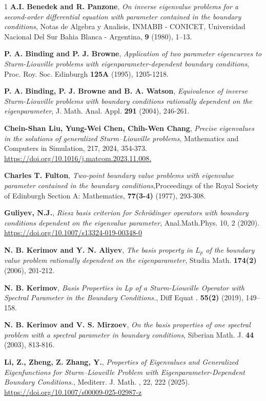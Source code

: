 \documentclass[pdflatex,sn-mathphys-num]{sn-jnl}%
\theoremstyle{thmstyleone}%
\theoremstyle{thmstyletwo}%
\theoremstyle{thmstylethree}%
\theoremstyle{definition}
\theoremstyle{remark}
\numberwithin{equation}{section}
\begin{document}
\begin{thebibliography}{1}
\textbf{A.I. Benedek and R. Panzone}, \textit{On inverse eigenvalue problems for a second-order differential
equation with parameter contained in the boundary conditions}, Notas de Algebra y Analisis, INMABB - CONICET, 
Universidad Nacional Del Sur
Bahia Blanca - Argentina, \textbf{9} (1980), 1–13.

\textbf{P. A. Binding and P. J. Browne}, \textit{Application of
two parameter eigencurves to Sturm-Liouville problems with
eigenparameter-dependent boundary conditions}, Proc. Roy. Soc.
Edinburgh \textbf{125A} (1995), 1205-1218.


\textbf{P. A. Binding, P. J. Browne and B. A. Watson},
\textit{Equivalence of inverse Sturm-Liouville problems with
boundary conditions rationally dependent on the eigenparameter},
J. Math. Anal. Appl. \textbf{291} (2004), 246-261.

\textbf{Chein-Shan Liu, Yung-Wei Chen, Chih-Wen Chang},
\textit{Precise eigenvalues in the solutions of generalized Sturm–Liouville problems}, Mathematics and Computers in Simulation, 217, 2024, 354-373.
\url{https://doi.org/10.1016/j.matcom.2023.11.008.}

\textbf{Charles T. Fulton}, \textit{Two-point boundary value problems with eigenvalue parameter contained in the boundary conditions},Proceedings of the Royal Society of Edinburgh Section A: Mathematics, \textbf{77(3-4)} (1977), 293-308.

\textbf{Guliyev, N.J.}, \textit{Riesz basis criterion for Schrödinger operators with boundary conditions dependent on the eigenvalue parameter}, Anal.Math.Phys. 10, 2 (2020). \url{https://doi.org/10.1007/s13324-019-00348-0}


\textbf{N. B. Kerimov and Y. N. Aliyev}, \textit{The basis
property in $L_p$ of the boundary value problem rationally
dependent on the eigenparameter}, Studia Math. \textbf{174(2)} (2006),
201-212.

\textbf{N. B. Kerimov}, \textit{Basis Properties in Lp of a Sturm-Liouville Operator with Spectral Parameter in the Boundary Conditions.},  Diff Equat . \textbf{55(2)} (2019),
149–158.

\textbf{N. B. Kerimov and V. S. Mirzoev}, \textit{On the basis
properties of one spectral problem with a spectral parameter in
boundary conditions}, Siberian Math. J. \textbf{44} (2003), 813-816.

\textbf{Li, Z., Zheng, Z. Zhang, Y.},
\textit{Properties of Eigenvalues and Generalized Eigenfunctions for Sturm–Liouville Problem with Eigenparameter-Dependent Boundary Conditions.}, Mediterr. J. Math. , 22, 222 (2025). \url{https://doi.org/10.1007/s00009-025-02987-z}


\end{thebibliography}
\end{document}
